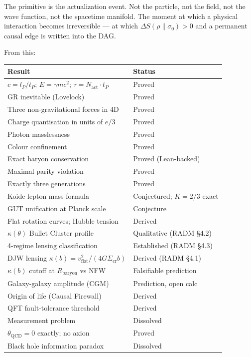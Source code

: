 \documentclass[11pt,a4paper]{article}
\begin{document}
The primitive is the actualization event. Not the particle, not
the field, not the wave function, not the spacetime manifold.
The moment at which a physical interaction becomes irreversible ---
at which $\Delta S(\rho\|\sigma_0) > 0$ and a permanent causal edge
is written into the DAG.

From this:

\medskip
\begin{center}
\renewcommand{\arraystretch}{1.2}
\begin{tabular}{ll}
\toprule
Result & Status \\
\midrule
$c = l_P/t_P$; $E = \gamma mc^2$; $\tau = N_{\mathrm{act}}\cdot t_P$ & Proved \\
GR inevitable (Lovelock) & Proved \\
Three non-gravitational forces in 4D & Proved \\
Charge quantisation in units of $e/3$ & Proved \\
Photon masslessness & Proved \\
Colour confinement & Proved \\
Exact baryon conservation & Proved (Lean-backed) \\
Maximal parity violation & Proved \\
Exactly three generations & Proved \\
Koide lepton mass formula & Conjectured; $K = 2/3$ exact \\
GUT unification at Planck scale & Conjecture \\
Flat rotation curves; Hubble tension & Derived \\
$\kappa(\theta)$ Bullet Cluster profile & Qualitative (RADM §4.2) \\
4-regime lensing classification & Established (RADM §4.3) \\
DJW lensing $\kappa(b) = v_\mathrm{flat}^2/(4G\Sigma_\mathrm{cr}b)$ & Derived (RADM §4.1) \\
$\kappa(b)$ cutoff at $R_\mathrm{baryon}$ vs NFW & Falsifiable prediction \\
Galaxy-galaxy amplitude (CGM) & Prediction, open calc \\
Origin of life (Causal Firewall) & Derived \\
QFT fault-tolerance threshold & Derived \\
Measurement problem & Dissolved \\
$\theta_{\mathrm{QCD}} = 0$ exactly; no axion & Proved \\
Black hole information paradox & Dissolved \\

\end{tabular}
\end{center}
\end{document}
